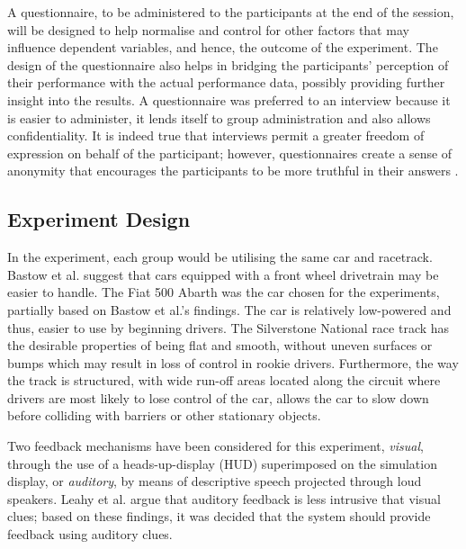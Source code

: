A questionnaire, to be administered to the participants at the end of the session, will be designed to help normalise and control for other factors that may influence dependent variables, and hence, the outcome of the experiment. The design of the questionnaire also helps in bridging the participants' perception of their performance with the actual performance data, possibly providing further insight into the results. A questionnaire was preferred to an interview because it is easier to administer, it lends itself to group administration and also allows confidentiality. It is indeed true that interviews permit a greater freedom of expression on behalf of the participant; however, questionnaires create a sense of anonymity that encourages the participants to be more truthful in their answers \cite{introductiontobehavioralresearchmethods}.

\subsection{Experiment Design}
\label{sec:meth-experiment-design}
In the experiment, each group would be utilising the same car and racetrack. Bastow et al. \cite{bastow2004car} suggest that cars equipped with a front wheel drivetrain may be easier to handle. The Fiat 500 Abarth was the car chosen for the experiments, partially based on Bastow et al.'s findings. The car is relatively low-powered and thus, easier to use by beginning drivers. The Silverstone National race track has the desirable properties of being flat and smooth, without uneven surfaces or bumps which may result in loss of control in rookie drivers. Furthermore, the way the track is structured, with wide run-off areas located along the circuit where drivers are most likely to lose control of the car, allows the car to slow down before colliding with barriers or other stationary objects.

Two feedback mechanisms have been considered for this experiment, \emph{visual}, through the use of a heads-up-display (HUD) superimposed on the simulation display, or \emph{auditory}, by means of descriptive speech projected through loud speakers. Leahy et al. \cite{leahy2003auditory} argue that auditory feedback is less intrusive that visual clues; based on these findings, it was decided that the system should provide feedback using auditory clues.

